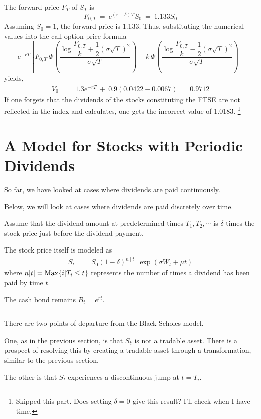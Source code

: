 \documentclass[uplatex,a4j,12pt,dvipdfmx]{jsarticle}
\begin{document}
The forward price $F_{T}$ of $S_{T}$ is
$$
	F_{0,T}
	\ = \
	e^{(r-\delta)T}S_{0}
	\ = \
	1.133 S_0
$$
Assuming $S_0=1$, the forward price is 1.133.
Thus, substituting the numerical values into the call option price formula
$$
	e^{-rT} \left[
		F_{0,T}
		\ \! \Phi
		\left(
		\dfrac{
			\log \dfrac{F_{0,T}}{k} + \dfrac{1}{2} ( \sigma \sqrt{T} )^{2}
		}
		{\sigma \sqrt{T}}
		\right)
		-
		k
		\ \! \Phi
		\left(
		\dfrac{
			\log \dfrac{F_{0,T}}{k} - \dfrac{1}{2} ( \sigma \sqrt{T} )^{2}
		}
		{\sigma \sqrt{T}}
		\right)
		\right]
$$
yields,
%
%
\begin{eqnarray*}
	V_{0}
	&=&
	1.3 e^{-rT}
	\ + \
	0.9
	(0.0422 - 0.0067)
	\ = \
	0.9712
\end{eqnarray*}
%
%
If one forgets that the dividends of the stocks constituting the FTSE are not reflected in the index and calculates, one gets the incorrect value of 1.0183.
\footnote{Skipped this part. Does setting $\delta=0$ give this result? I'll check when I have time.}
\section{A Model for Stocks with Periodic Dividends}

So far, we have looked at cases where dividends are paid continuously.

Below, we will look at cases where dividends are paid discretely over time.

Assume that the dividend amount at predetermined times $T_{1},T_{2},\cdots$ is $\delta$ times the stock price just before the dividend payment.

The stock price itself is modeled as
%
%
\begin{eqnarray*}
	S_{t}
	&=&
	S_{0} (1-\delta)^{n[t]}
	\exp(\sigma W_{t} + \mu t)
\end{eqnarray*}
%
%
where $n[t]={\rm Max} \{ i | T_{i} \le t\}$ represents the number of times a dividend has been paid by time $t$.

The cash bond remains $B_{t}=e^{rt}$.

${}$

There are two points of departure from the Black-Scholes model.

One, as in the previous section, is that $S_{t}$ is not a tradable asset. There is a prospect of resolving this by creating a tradable asset through a transformation, similar to the previous section.

The other is that $S_{t}$ experiences a discontinuous jump at $t=T_{i}$.
\end{document}

